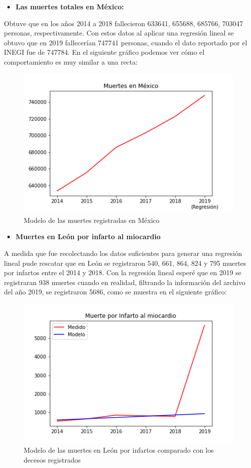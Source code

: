 \documentclass[12pt,letterpaper]{article}
\begin{document}
\begin{itemize}
    \item \textbf{Las muertes totales en México: }
\end{itemize}
Obtuve que en los años 2014 a 2018 fallecieron 633641, 655688, 685766, 703047 personas, respectivamente. Con estos datos al aplicar una regresión lineal se obtuvo que en 2019 fallecerían 747741 personas, cuando el dato reportado por el INEGI fue de 747784. En el siguiente gráfico podemos ver cómo el comportamiento es muy similar a una recta: 
\begin{figure}[H]
    \centering
    \includegraphics[scale=0.8]{ModeloMuertes.png}
    \caption{Modelo de las muertes registradas en México}
    \label{fig:my_label}
\end{figure}
\begin{itemize}
    \item \textbf{Muertes en León por infarto al miocardio}
\end{itemize}
A medida que fue recolectando los datos suficientes para generar una regresión lineal pude rescatar que en León se registraron 540, 661, 864, 824 y 795 muertes por infartos entre el 2014 y 2018. Con la regresión lineal esperé que en 2019 se registraran 938 muertes cuando en realidad, filtrando la información del archivo del año 2019, se registraron 5686, como se muestra en el siguiente gráfico:
\begin{figure}[H]
    \centering
    \includegraphics[scale=0.6]{Infarto.png}
    \caption{Modelo de las muertes en León por infartos comparado con los decesos registrados}
    \label{fig:my_label}
\end{figure}
\end{document}
